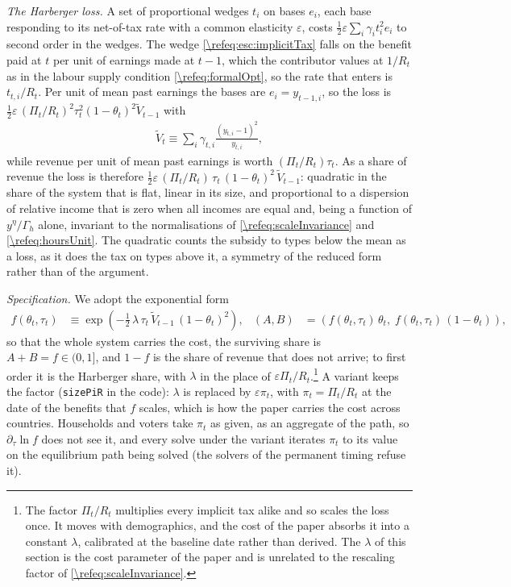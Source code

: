 \emph{The Harberger loss.} A set of proportional wedges $t_i$ on bases $e_i$, each base responding to its net-of-tax rate with a common elasticity $\varepsilon$, costs $\frac{1}{2}\varepsilon\sum_i\gamma_it_i^2e_i$ to second order in the wedges. The wedge \eqref{\refeq:esc:implicitTax} falls on the benefit paid at $t$ per unit of earnings made at $t-1$, which the contributor values at $1/R_t$ as in the labour supply condition \eqref{\refeq:formalOpt}, so the rate that enters is $t_{t,i}/R_t$. Per unit of mean past earnings the bases are $e_i = y_{t-1,i}$, so the loss is $\frac{1}{2}\varepsilon\,(\Pi_t/R_t)^2\tau_t^2(1-\theta_t)^2\tilde{V}_{t-1}$ with
\begin{align}\label{\refeq:esc:Vtilde}
    \tilde{V}_{t} \equiv \sum_i\gamma_{t,i}\frac{\left(y_{t,i}-1\right)^2}{y_{t,i}},
\end{align}
while revenue per unit of mean past earnings is worth $(\Pi_t/R_t)\tau_t$. As a share of revenue the loss is therefore $\frac{1}{2}\varepsilon\,(\Pi_t/R_t)\,\tau_t\,(1-\theta_t)^2\,\tilde{V}_{t-1}$: quadratic in the share of the system that is flat, linear in its size, and proportional to a dispersion of relative income that is zero when all incomes are equal and, being a function of $y^{\eta}/\Gamma_h$ alone, invariant to the normalisations of \eqref{\refeq:scaleInvariance} and \eqref{\refeq:hoursUnit}. The quadratic counts the subsidy to types below the mean as a loss, as it does the tax on types above it, a symmetry of the reduced form rather than of the argument.

\emph{Specification.} We adopt the exponential form
\begin{align}\label{\refeq:esc:AB}
    f(\theta_t,\tau_t) &\equiv \exp\left(-\tfrac{1}{2}\,\lambda\,\tau_t\,\tilde{V}_{t-1}\,(1-\theta_t)^2\right), &
    \left(A,B\right) &= \left(f(\theta_t,\tau_t)\,\theta_t,\; f(\theta_t,\tau_t)\,(1-\theta_t)\right),
\end{align}
so that the whole system carries the cost, the surviving share is $A+B=f\in(0,1]$, and $1-f$ is the share of revenue that does not arrive; to first order it is the Harberger share, with $\lambda$ in the place of $\varepsilon\Pi_t/R_t$.\footnote{The factor $\Pi_t/R_t$ multiplies every implicit tax alike and so scales the loss once. It moves with demographics, and the cost of the paper absorbs it into a constant $\lambda$, calibrated at the baseline date rather than derived. The $\lambda$ of this section is the cost parameter of the paper and is unrelated to the rescaling factor of \eqref{\refeq:scaleInvariance}.} A variant keeps the factor (\texttt{sizePiR} in the code): $\lambda$ is replaced by $\varepsilon\pi_t$, with $\pi_t = \Pi_t/R_t$ at the date of the benefits that $f$ scales, which is how the paper carries the cost across countries. Households and voters take $\pi_t$ as given, as an aggregate of the path, so $\partial_{\tau}\ln f$ does not see it, and every solve under the variant iterates $\pi_t$ to its value on the equilibrium path being solved (the solvers of the permanent timing refuse it).

